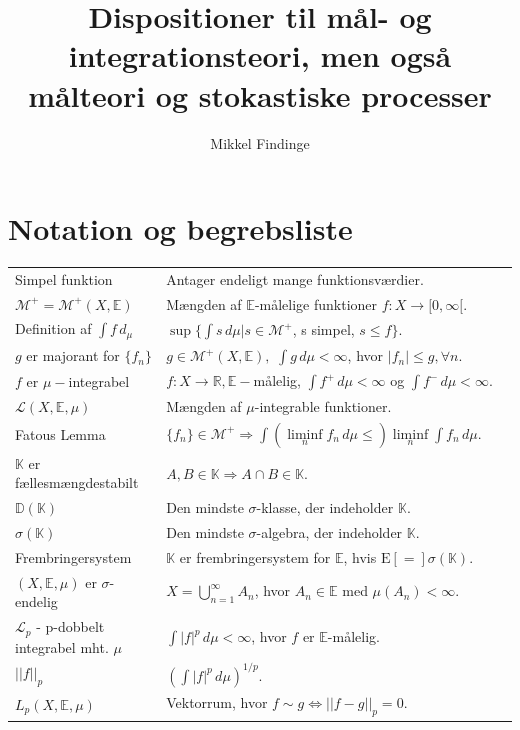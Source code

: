 \documentclass[12pt]{report}
\title{Dispositioner til mål- og integrationsteori, men også målteori og stokastiske processer}
\author{Mikkel Findinge}
\theoremstyle{break}
\theoremstyle{break}
\newcommand{\E}[1]{\mathrm{E}\left[#1\right]}
\newcommand{\Int}[1]{\int#1\,d\mu}
\newcommand{\RR}{\mathbb{R}}
\newcommand{\EE}{\mathbb{E}}
\newcommand{\M}{\mathcal{M}^+}
\renewcommand{\L}{\mathcal{L}}
\newcommand{\K}{\mathbb{K}}
\newcommand{\D}{\mathbb{D}}
\newcommand{\laengde}[1]{\lvert|#1\rvert|}
\newcommand{\1}{\mathds{1}}
\begin{document}
\maketitle
{}

\section*{Notation og begrebsliste}
\renewcommand{\arraystretch}{3}
\begin{tabular}{p{0.3\linewidth}p{0.7\linewidth}}
Simpel funktion & Antager endeligt mange funktionsværdier.
\\
$\M=\M(X,\EE)$ & Mængden af $\EE$-målelige funktioner $f\colon X\to[0,\infty[$.
\\
Definition af $\int f\, d_\mu$ & $\sup\{\int s\, d\mu| s\in\M$, s simpel, $s\leq f\}$.
\\
$g$ er majorant for $\{f_n\}$ & $g\in\M(X,\EE),$ $\int g\, d\mu<\infty$, hvor $\lvert f_n\rvert\leq g, \forall n$.
\\
$f$ er $\mu-$integrabel & $f\colon X\to\RR, \EE-$målelig, $\int f^+\, d\mu<\infty$ og $\int f^-\, d\mu<\infty$.
\\
$\L(X,\EE,\mu)$ & Mængden af $\mu$-integrable funktioner.
\\
Fatous Lemma & $\{f_n\}\in\M\Rightarrow\int\left(\liminf\limits_nf_n\, d\mu\leq\right)\liminf\limits_n\int f_n\, d\mu.$
\\
$\K$ er fællesmængdestabilt & $A,B\in\K\Rightarrow A\cap B\in\K$.
\\
$\D(\K)$ & Den mindste $\sigma$-klasse, der indeholder $\K$.
\\
$\sigma(\K)$ & Den mindste $\sigma$-algebra, der indeholder $\K$.
\\
Frembringersystem & $\K$ er frembringersystem for $\EE$, hvis $\E = \sigma(\K)$.
\\
$(X,\EE,\mu)$ er $\sigma$-endelig & $X = \bigcup_{n = 1}^\infty  {A_n}$, hvor $A_n\in\EE$ med $\mu(A_n)<\infty$.
\\
$\L_p$ - p-dobbelt integrabel mht. $\mu$ & $\Int{|f|^p}<\infty$, hvor $f$ er $\EE$-målelig.
\\
$\laengde{f}_p$ & $\left(\Int{|f|^p}\right)^{1/p}$.
\\
$L_p(X,\EE,\mu)$ & Vektorrum, hvor $f\sim g\Leftrightarrow\laengde{f-g}_p=0$.
\end{tabular}
\end{document}
